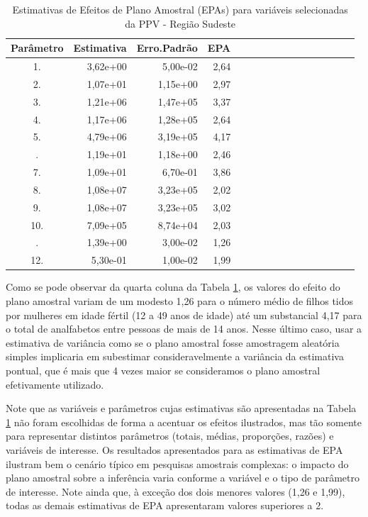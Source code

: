 \documentclass[]{book}
\theoremstyle{definition}
\theoremstyle{definition}
\theoremstyle{definition}
\theoremstyle{remark}
\begin{document}
\begin{table}

\caption{\label{tab:epas}Estimativas de Efeitos de Plano Amostral (EPAs)
para variáveis selecionadas da PPV - Região Sudeste}
\centering
\begin{tabular}[t]{crrrcrrrcrrrcrrr}
\toprule
Parâmetro & Estimativa & Erro.Padrão & EPA\\
\midrule
1. & 3,62e+00 & 5,00e-02 & 2,64\\
2. & 1,07e+01 & 1,15e+00 & 2,97\\
3. & 1,21e+06 & 1,47e+05 & 3,37\\
4. & 1,17e+06 & 1,28e+05 & 2,64\\
5. & 4,79e+06 & 3,19e+05 & 4,17\\
\addlinespace
6. & 1,19e+01 & 1,18e+00 & 2,46\\
7. & 1,09e+01 & 6,70e-01 & 3,86\\
8. & 1,08e+07 & 3,23e+05 & 2,02\\
9. & 1,08e+07 & 3,23e+05 & 3,02\\
10. & 7,09e+05 & 8,74e+04 & 2,03\\
\addlinespace
11. & 1,39e+00 & 3,00e-02 & 1,26\\
12. & 5,30e-01 & 1,00e-02 & 1,99\\
\bottomrule
\end{tabular}
\end{table}

Como se pode observar da quarta coluna da Tabela \ref{tab:epas}, os
valores do efeito do plano amostral variam de um modesto 1,26 para o
número médio de filhos tidos por mulheres em idade fértil (12 a 49 anos
de idade) até um substancial 4,17 para o total de analfabetos entre
pessoas de mais de 14 anos. Nesse último caso, usar a estimativa de
variância como se o plano amostral fosse amostragem aleatória simples
implicaria em subestimar consideravelmente a variância da estimativa
pontual, que é mais que 4 vezes maior se consideramos o plano amostral
efetivamente utilizado.

Note que as variáveis e parâmetros cujas estimativas são apresentadas na
Tabela \ref{tab:epas} não foram escolhidas de forma a acentuar os
efeitos ilustrados, mas tão somente para representar distintos
parâmetros (totais, médias, proporções, razões) e variáveis de
interesse. Os resultados apresentados para as estimativas de EPA
ilustram bem o cenário típico em pesquisas amostrais complexas: o
impacto do plano amostral sobre a inferência varia conforme a variável e
o tipo de parâmetro de interesse. Note ainda que, à exceção dos dois
menores valores (1,26 e 1,99), todas as demais estimativas de EPA
apresentaram valores superiores a 2.
\end{document}
